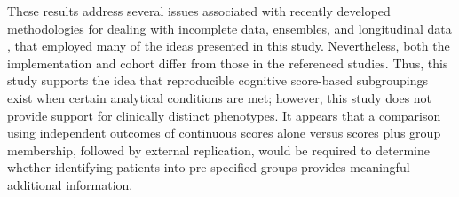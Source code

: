 These results address several issues associated with recently developed methodologies for dealing with incomplete data, ensembles, and longitudinal data \parencite{tong2025mixturemissing,tomo2026ensemble,julia2026longitudinal}, that employed many of the ideas presented in this study. Nevertheless, both the implementation and cohort differ from those in the referenced studies. Thus, this study supports the idea that reproducible cognitive score-based subgroupings exist when certain analytical conditions are met; however, this study does not provide support for clinically distinct phenotypes. It appears that a comparison using independent outcomes of continuous scores alone versus scores plus group membership, followed by external replication, would be required to determine whether identifying patients into pre-specified groups provides meaningful additional information.
